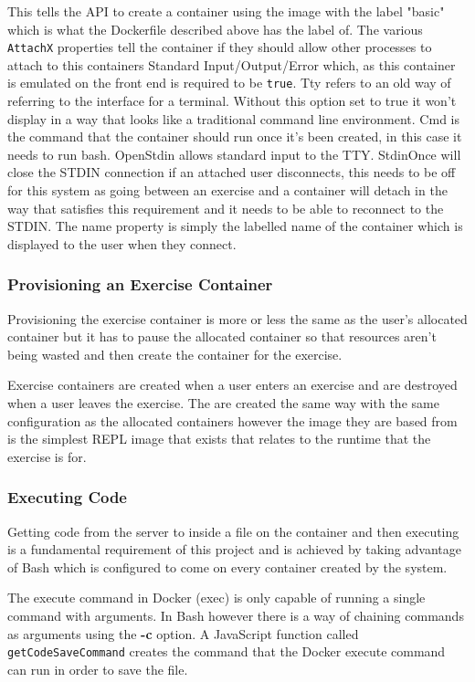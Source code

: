 This tells the API to create a container using the image with the label "basic" which is what the Dockerfile described above has the label of. The various \texttt{AttachX} properties tell the container if they should allow other processes to attach to this containers Standard Input/Output/Error which, as this container is emulated on the front end is required to be \texttt{true}. Tty refers to an old way of referring to the interface for a terminal. Without this option set to true it won't display in a way that looks like a traditional command line environment. Cmd is the command that the container should run once it's been created, in this case it needs to run bash. OpenStdin allows standard input to the TTY. StdinOnce will close the STDIN connection if an attached user disconnects, this needs to be off for this system as going between an exercise and a container will detach in the way that satisfies this requirement and it needs to be able to reconnect to the STDIN. The name property is simply the labelled name of the container which is displayed to the user when they connect.

\subsubsection{Provisioning an Exercise Container} \label{impl-exer-cont}

Provisioning the exercise container is more or less the same as the user's allocated container but it has to pause the allocated container so that resources aren't being wasted and then create the container for the exercise.

Exercise containers are created when a user enters an exercise and are destroyed when a user leaves the exercise. The are created the same way with the same configuration as the allocated containers however the image they are based from is the simplest REPL image that exists that relates to the runtime that the exercise is for.

\subsubsection{Executing Code} \label{imp-execode}

Getting code from the server to inside a file on the container and then executing is a fundamental requirement of this project and is achieved by taking advantage of Bash which is configured to come on every container created by the system.

The execute command in Docker (exec) is only capable of running a single command with arguments. In Bash however there is a way of chaining commands as arguments using the \textbf{-c} option. A JavaScript function called \texttt{getCodeSaveCommand} creates the command that the Docker execute command can run in order to save the file.

